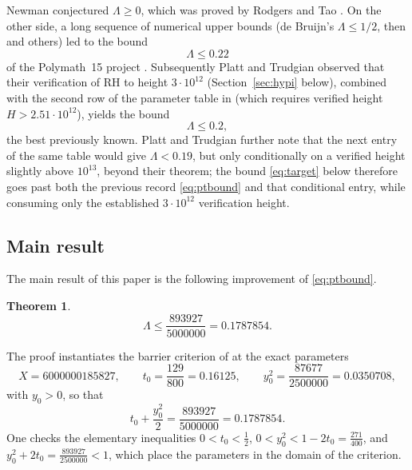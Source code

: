 \documentclass[11pt]{article}
\newtheorem{theorem}{Theorem}[section]
\theoremstyle{definition}
\newcommand{\LB}{\Lambda}
\begin{document}
Newman conjectured $\LB\ge0$, which was proved by Rodgers and Tao
\cite{RodgersTao}. On the other side, a long sequence of numerical
upper bounds (de Bruijn's $\LB\le1/2$, then
\cite{CsordasNorfolkVarga,KKL} and others) led to the bound
\begin{equation}\label{eq:polymathbound}
\LB\le0.22
\end{equation}
of the Polymath~15 project \cite{Polymath}. Subsequently Platt and
Trudgian observed \cite[Corollary~2]{PlattTrudgian} that their
verification of RH to height $3\cdot10^{12}$
(Section~\ref{sec:hypi} below), combined with the second row of the
parameter table in \cite[Table~1, p.~65]{Polymath} (which requires
verified height $H>2.51\cdot10^{12}$), yields the bound
\begin{equation}\label{eq:ptbound}
\LB\le0.2 ,
\end{equation}
the best previously known. Platt and Trudgian further note
that the next entry of the same table would give $\LB<0.19$, but only
conditionally on a verified height slightly above $10^{13}$, beyond
their theorem; the bound \eqref{eq:target} below therefore
goes past both the previous record \eqref{eq:ptbound} and that
conditional entry, while consuming only the established
$3\cdot10^{12}$ verification height.

\subsection{Main result}

The main result of this paper is the following improvement of
\eqref{eq:ptbound}.

\begin{theorem}\label{thm:main}
\[
\LB\le\frac{893927}{5000000}=0.1787854 .
\]
\end{theorem}

The proof instantiates the barrier criterion of
\cite[Theorem~1.2]{Polymath} at the exact parameters
\begin{equation}\label{eq:params}
X=6000000185827,\qquad
t_0=\frac{129}{800}=0.16125,\qquad
y_0^2=\frac{87677}{2500000}=0.0350708,
\end{equation}
with $y_0>0$, so that
\begin{equation}\label{eq:target}
t_0+\frac{y_0^2}{2}=\frac{893927}{5000000}=0.1787854 .
\end{equation}
One checks the elementary inequalities
$0<t_0<\tfrac12$, $0<y_0^2<1-2t_0=\tfrac{271}{400}$, and
$y_0^2+2t_0=\tfrac{893927}{2500000}<1$, which place the parameters in
the domain of the criterion.
\end{document}
